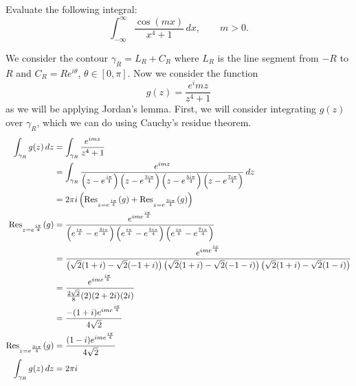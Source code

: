 
\setcounter{question}{0}
\question 
Evaluate the following integral:
\[
    \int_{-\infty}^{\infty} \frac{\cos(mx)}{x^4 + 1} \,dx, \qquad m > 0.
\]
\begin{solution}
    We consider the contour $\gamma_R = L_R + C_R$ where
    $L_R$ is the line segment from $-R$ to $R$
    and $C_R = Re^{i\theta}$, $\theta \in [0, \pi]$.
    Now we consider the function
    \[
        g(z) = \frac{e^imz}{z^4 + 1}
    \]
    as we will be applying Jordan's lemma.
    First, we will consider integrating $g(z)$ over $\gamma_R$,
    which we can do using Cauchy's residue theorem.
    \begin{align*}
        \int_{\gamma_R} g(z) \,dz
        &= \int_{\gamma_R} \frac{e^{imz}}{z^4 + 1} \\
        &= \int_{\gamma_R} 
        \frac{e^{imz}}
        {
            \left(
                z - e^{\frac{i\pi}{4}}
            \right)
            \left(
                z - e^{\frac{3i\pi}{4}}
            \right)
            \left(
                z - e^{\frac{5i\pi}{4}}
            \right)
            \left(
                z - e^{\frac{7i\pi}{4}}
            \right)
        } \,dz \\
        &= 2\pi i \left(\Res_{z=e^{\frac{i\pi}4}}(g) + \Res_{z=e^{\frac{3i\pi}4}}(g)\right) \\
        \Res_{z=e^{\frac{i\pi}4}}(g)
        &= \frac{e^{ime^{\frac{i\pi}4}}}
        {
            \left(
                e^{\frac{i\pi}4} - e^{\frac{3i\pi}{4}}
            \right)
            \left(
                e^{\frac{i\pi}4} - e^{\frac{5i\pi}{4}}
            \right)
            \left(
                e^{\frac{i\pi}4} - e^{\frac{7i\pi}{4}}
            \right)
        } \\
        &= \frac{e^{ime^{\frac{i\pi}4}}}
        {
            \left(
                \sqrt 2 (1+i) - \sqrt 2(-1+i)
            \right)
            \left(
                \sqrt 2 (1+i) - \sqrt 2 (-1-i)
            \right)
            \left(
                \sqrt 2 (1+i) - \sqrt 2 (1-i)
            \right)
        } \\
        &= \frac{e^{ime^{\frac{i\pi}4}}}{\frac{2\sqrt 2}{8} (2)(2 + 2i)(2i)} \\
        &= \frac{-(1+i)e^{ime^{\frac{i\pi}4}}}{4\sqrt 2} \\
        \Res_{z=e^{\frac{3i\pi}4}}(g)
        &= \frac{(1-i)e^{ime^{\frac{i\pi}4}}}{4\sqrt 2} \\
        \int_{\gamma_R} g(z) \,dz
        &= 2\pi i

\end{align*}
\end{solution}
